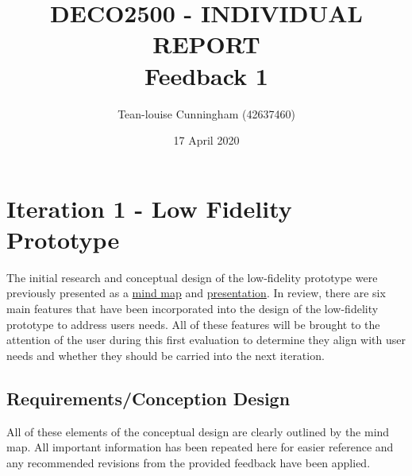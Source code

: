 \documentclass[a4 paper, 12pt]{article}
\title{DECO2500 - INDIVIDUAL REPORT \\ Feedback 1}
\author{Tean-louise Cunningham (42637460)}
\date{17 April 2020}
\begin{document}
\section{Iteration 1 - Low Fidelity Prototype}
The initial research and conceptual design of the low-fidelity prototype were previously presented as a \href{run:../MindMap/MindMap.pdf}{mind map} and \href{https://youtu.be/BRX7kF7ynSQ}{presentation}. In review, there are six main features that have been incorporated into the design of the low-fidelity prototype to address users needs. All of these features will be brought to the attention of the user during this first evaluation to determine they align with user needs and whether they should be carried into the next iteration.

    \subsection{Requirements/Conception Design}
    All of these elements of the conceptual design are clearly outlined by the mind map. All important information has been repeated here for easier reference and any recommended revisions from the provided feedback have been applied.
\end{document}
